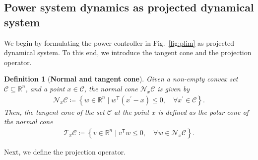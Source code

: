 \documentclass[twocolumn,twoside,journal]{IEEEtran}
\newcommand{\mc}{\mathcal}
\newtheorem{definition}{Definition}
\begin{document}
\subsection{Power system dynamics as projected dynamical system}
We begin by formulating the power controller in Fig.~\ref{fig:plim} as projected dynamical system. To this end, we introduce the tangent cone and the projection operator.
%
\begin{definition}[\textbf{Normal and tangent cone}]\label{def:tangentcone}
    Given a non-empty convex set $\mathcal{C} \subseteq \mathbb{R}^n$, and a point $x \in \mathcal{C}$, the normal cone $\mathcal N_{x} \mathcal{C}$ is given by
    \begin{align*}
        \mathcal{N}_{x}\mathcal{C} \coloneqq \left\{w\in \mathbb{R}^n \mid w^\mathsf{T}\left(x^{\prime}-x\right) \leq 0, \quad \forall x^{\prime} \in \mathcal{C}\right\}.
    \end{align*} 
    Then, the tangent cone of the set $\mathcal{C}$ at the point $x$ is defined as the polar cone of the normal cone
    \begin{align*}
        \mathcal{T}_{x}\mathcal{C} \coloneqq \left\{v \in \mathbb{R}^n \mid v^\mathsf{T} w \leq 0,\quad \forall w \in \mc N_x \mc C\right\}.
    \end{align*} 
\end{definition}
%
Next, we define the projection operator.
\end{document}
